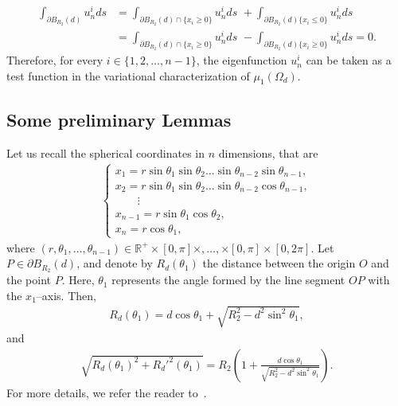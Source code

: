 \documentclass[12pt,reqno]{amsart}
\numberwithin{equation}{section}
\numberwithin{theorem}{section}
\numberwithin{equation}{section}
\numberwithin{theorem}{section}
\begin{document}
\begin{align*}
    \int_{\partial B_{R_2}(d)} u_n^i ds &= \int_{\partial B_{R_2}(d) \cap \{x_i\geq 0\}} u_n^i ds \,\,+ \int_{\partial B_{R_2}(d) \{x_i\leq 0\}} u_n^i ds\\
    &= \int_{\partial B_{R_2}(d) \cap \{x_i\geq 0\}} u_n^i ds \,\,- \int_{\partial B_{R_2}(d) \{x_i\geq 0\}} u_n^i ds=0.
\end{align*}
 Therefore, for every  $i\in \{1,2, \dots, n-1\} $, the eigenfunction $u_n^i$ can be taken as a test function in the variational characterization of $\mu_1(\Omega_d).$

 \subsection{Some preliminary Lemmas}
Let us recall the spherical coordinates in $n$ dimensions, that are
\begin{align*}
    \begin{cases}
    x_1=r\sin \theta_1 \sin \theta_2 \dots \sin \theta_{n-2}\sin \theta_{n-1},\\
    x_2=r\sin \theta_1 \sin \theta_2 \dots \sin \theta_{n-2}\cos \theta_{n-1},\\ 
    \quad \quad \vdots\\
     x_{n-1}= r\sin \theta_1 \cos \theta_2,\\
     x_n= r\cos \theta_1,
\end{cases}
\end{align*}
where $(r, \theta_1, \dots, \theta_{n-1})\in \mathbb{R^+} \times [0,\pi]\times,\dots,\times [0,\pi]\times [0,2\pi].$
Let $P \in \partial B_{R_2}(d)$, and denote by $R_d(\theta_1)$ the distance between the origin $O$ and the point $P$.  Here, $\theta_1$ represents the angle formed by the line segment $OP$ with the $x_1$–axis. Then, 
\begin{align*}
   R_d(\theta_1) = d \cos \theta_1 + \sqrt{R_2^2 - d^2 \sin^2 \theta_1}, 
\end{align*}
and 
\begin{align*}
  \sqrt{R_d(\theta_1)^2 + {R_{d}'^2(\theta_1)}}
= R_2 \left( 1 + \frac{d \cos \theta_1}{\sqrt{R_2^2 - d^2 \sin^2 \theta_1}} \right).  
\end{align*}
For more details, we refer the reader to~\cite{ftouhi2022place}.
\end{document}
